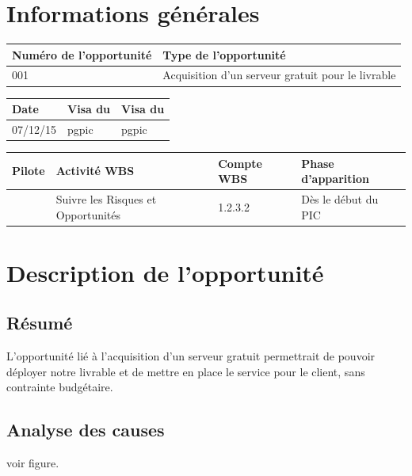 \section*{Informations générales}
 
\begin{table}[h]
\centering
	\begin{tabularx}{16.8cm}{|X|X|}
	\hline
	\rowcolor{gray!40} Numéro de l'opportunité & Type de l'opportunité \\
	\hline
	001 & Acquisition d'un serveur gratuit pour le livrable \\
	\hline
	\end{tabularx}
\end{table}

\begin{table}[H]
\centering
	\begin{tabularx}{16.8cm}{|X|X|X|}
	\hline
	\rowcolor{gray!40} Date & Visa du \RQ & Visa du \CP \\
	\hline
	 07/12/15 & pgpic & pgpic \\
	\hline
	\end{tabularx}
\end{table}

\begin{table}[h]
\centering
	\begin{tabularx}{16.8cm}{|X|X|X|X|}
	\hline
	\rowcolor{gray!40} Pilote & Activité WBS & Compte WBS & Phase d'apparition \\
	\hline
	 \Matthieu & Suivre les Risques et Opportunités & 1.2.3.2 & Dès le début du PIC\\
	\hline
	\end{tabularx}
\end{table}

\section*{Description de l'opportunité}

\subsection*{Résumé}
	L'opportunité lié à l'acquisition d'un serveur gratuit permettrait de pouvoir déployer notre livrable et de mettre en place le service pour le client, sans contrainte budgétaire.
	
\subsection*{Analyse des causes}
	voir figure.

